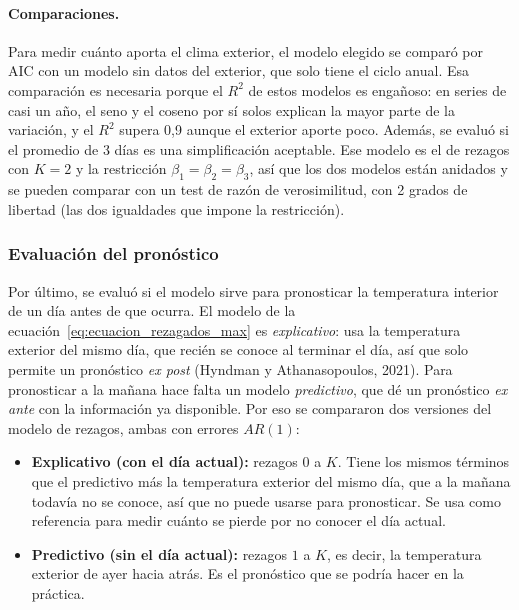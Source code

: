 \documentclass[11pt,a4paper]{article}
\begin{document}
\paragraph{Comparaciones.} Para medir cuánto aporta el clima exterior, el modelo elegido se comparó por AIC con un modelo sin datos del exterior, que solo tiene el ciclo anual. Esa comparación es necesaria porque el $R^2$ de estos modelos es engañoso: en series de casi un año, el seno y el coseno por sí solos explican la mayor parte de la variación, y el $R^2$ supera 0{,}9 aunque el exterior aporte poco. Además, se evaluó si el promedio de 3 días es una simplificación aceptable. Ese modelo es el de rezagos con $K = 2$ y la restricción $\beta_1 = \beta_2 = \beta_3$, así que los dos modelos están anidados y se pueden comparar con un test de razón de verosimilitud, con 2 grados de libertad (las dos igualdades que impone la restricción).

\subsubsection{Evaluación del pronóstico}
Por último, se evaluó si el modelo sirve para pronosticar la temperatura interior de un día antes de que ocurra. El modelo de la ecuación~\ref{eq:ecuacion_rezagados_max} es \textit{explicativo}: usa la temperatura exterior del mismo día, que recién se conoce al terminar el día, así que solo permite un pronóstico \textit{ex post} (Hyndman y Athanasopoulos, 2021). Para pronosticar a la mañana hace falta un modelo \textit{predictivo}, que dé un pronóstico \textit{ex ante} con la información ya disponible. Por eso se compararon dos versiones del modelo de rezagos, ambas con errores $AR(1)$:
\begin{itemize}
    \item \textbf{Explicativo (con el día actual):} rezagos $0$ a $K$. Tiene los mismos términos que el predictivo más la temperatura exterior del mismo día, que a la mañana todavía no se conoce, así que no puede usarse para pronosticar. Se usa como referencia para medir cuánto se pierde por no conocer el día actual.
    \item \textbf{Predictivo (sin el día actual):} rezagos $1$ a $K$, es decir, la temperatura exterior de ayer hacia atrás. Es el pronóstico que se podría hacer en la práctica.
\end{itemize}
\end{document}
